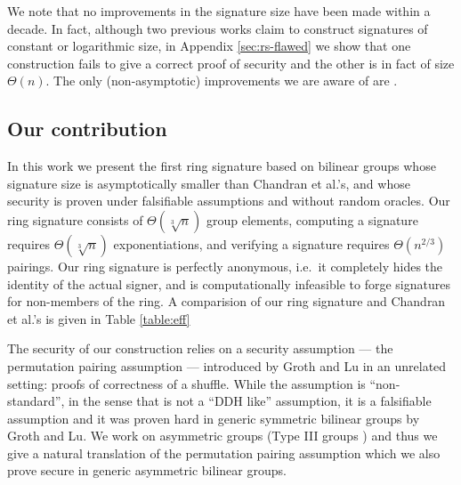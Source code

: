 We note that no improvements in the
signature size have been made within a decade. In fact, although two previous works claim to construct signatures of constant \cite{ACISP:BosDasRan15} or logarithmic \cite{IET:GriSusPla16} size, in Appendix \ref{sec:rs-flawed} we show that one construction fails to give a correct proof of security and the other is in fact of size $\Theta(n)$. The only (non-asymptotic) improvements we are aware of are \cite{TCC:Rafols15,AC:GonHevRaf15}.

\subsection{Our contribution}
In this work we present the first ring signature based on bilinear groups whose signature size is asymptotically smaller than Chandran et al.'s, and whose security is proven under falsifiable assumptions and without random oracles. Our ring signature consists of $\Theta(\sqrt[3]{n})$ group elements, computing a signature requires $\Theta(\sqrt[3]{n})$ exponentiations, and verifying a signature requires $\Theta(n^{2/3})$ pairings. Our ring signature is perfectly anonymous, i.e.~it completely hides the identity of the actual signer, and is computationally infeasible to forge signatures for non-members of the ring. A comparision of our ring signature and Chandran et al.'s is given in Table \ref{table:eff}

The security of our construction relies on a security assumption --- the {permutation pairing assumption} --- introduced by Groth and Lu \cite{AC:GroLu07} in an unrelated setting: proofs of correctness of a shuffle. While the assumption is ``non-standard'', in the sense that is not a ``DDH like'' assumption, it is a falsifiable assumption and it was proven hard in generic symmetric bilinear groups by Groth and Lu. We work on asymmetric groups (Type III groups \cite{EPRINT:GalPatSma06}) and thus we give a natural translation of the permutation pairing assumption which we also prove secure in generic asymmetric bilinear groups.

 
